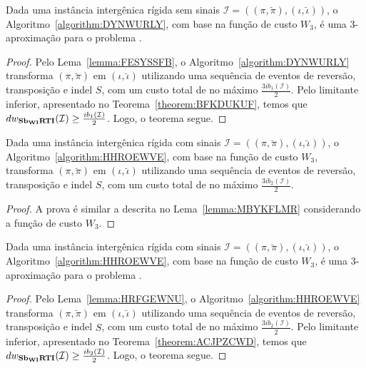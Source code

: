 \begin{theorem}\label{theorem:YFYDIUAB}
Dada uma instância intergênica rígida sem sinais $\mathcal{I}=((\pi,\breve\pi),(\iota,\breve\iota))$, o Algoritmo~\ref{algorithm:DYNWURLY}, com base na função de custo $W_3$, é uma $3$-aproximação para o problema \SbWIRTI{}.
\end{theorem}
\begin{proof}
Pelo Lema~\ref{lemma:FESYSSFB}, o Algoritmo~\ref{algorithm:DYNWURLY} transforma $(\pi,\breve\pi)$ em $(\iota,\breve\iota)$ utilizando uma sequência de eventos de reversão, transposição e indel $S$, com um custo total de no máximo $\frac{3ib_1(\mathcal{I})}{2}$. Pelo limitante inferior, apresentado no Teorema~\ref{theorem:BFKDUKUF}, temos que $dw_{\textbf{Sb\textsubscript{WI}RTI}}(\mathcal{I}) \ge \frac{ib_1(\mathcal{I})}{2}$. Logo, o teorema segue.
\end{proof}

\begin{lemma}\label{lemma:HRFGEWNU}
Dada uma instância intergênica rígida com sinais $\mathcal{I}=((\pi,\breve\pi),(\iota,\breve\iota))$, o Algoritmo~\ref{algorithm:HHROEWVE}, com base na função de custo $W_3$, transforma $(\pi,\breve\pi)$ em $(\iota,\breve\iota)$ utilizando uma sequência de eventos de reversão, transposição e indel $S$, com um custo total de no máximo $\frac{3ib_2(\mathcal{I})}{2}$.
\end{lemma}
\begin{proof}
  A prova é similar a descrita no Lema~\ref{lemma:MBYKFLMR} considerando a função de custo $W_3$.
\end{proof}

\begin{theorem}\label{theorem:UMSMTVTN}
Dada uma instância intergênica rígida com sinais $\mathcal{I}=((\pi,\breve\pi),(\iota,\breve\iota))$, o Algoritmo~\ref{algorithm:HHROEWVE}, com base na função de custo $W_3$, é uma $3$-aproximação para o problema \SbWIRTI{}.
\end{theorem}
\begin{proof}
Pelo Lema~\ref{lemma:HRFGEWNU}, o Algoritmo~\ref{algorithm:HHROEWVE} transforma $(\pi,\breve\pi)$ em $(\iota,\breve\iota)$ utilizando uma sequência de eventos de reversão, transposição e indel $S$, com um custo total de no máximo $\frac{3ib_2(\mathcal{I})}{2}$. Pelo limitante inferior, apresentado no Teorema~\ref{theorem:ACJPZCWD}, temos que $dw_{\textbf{Sb\textsubscript{WI}RTI}}(\mathcal{I}) \ge \frac{ib_2(\mathcal{I})}{2}$. Logo, o teorema segue.
\end{proof}

